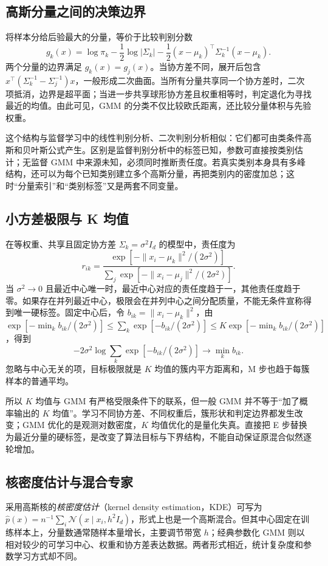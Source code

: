 \documentclass[UTF8,12pt,a4paper,fontset=fandol]{ctexart}
\begin{document}
\subsection{高斯分量之间的决策边界}
将样本分给后验最大的分量，等价于比较判别分数
\[
g_k(x)=\log\pi_k-\frac12\log|\Sigma_k|
-\frac12(x-\mu_k)^\top\Sigma_k^{-1}(x-\mu_k).
\]
两个分量的边界满足 $g_k(x)=g_j(x)$。当协方差不同，展开后包含 $x^\top(\Sigma_k^{-1}-\Sigma_j^{-1})x$，一般形成二次曲面。当所有分量共享同一个协方差时，二次项抵消，边界是超平面；当进一步共享球形协方差且权重相等时，判定退化为寻找最近的均值。由此可见，GMM 的分类不仅比较欧氏距离，还比较分量体积与先验权重。

这个结构与监督学习中的线性判别分析、二次判别分析相似：它们都可由类条件高斯和贝叶斯公式产生。区别是监督判别分析中的标签已知，参数可直接按类别估计；无监督 GMM 中来源未知，必须同时推断责任度。若真实类别本身具有多峰结构，还可以为每个已知类别建立多个高斯分量，再把类别内的密度加总；这时“分量索引”和“类别标签”又是两套不同变量。

\subsection{小方差极限与 K 均值}
在等权重、共享且固定协方差 $\Sigma_k=\sigma^2I_d$ 的模型中，责任度为
\[
r_{ik}=\frac{\exp[-\|x_i-\mu_k\|^2/(2\sigma^2)]}
{\sum_j\exp[-\|x_i-\mu_j\|^2/(2\sigma^2)]}.
\]
当 $\sigma^2\to0$ 且最近中心唯一时，最近中心对应的责任度趋于一，其他责任度趋于零。如果存在并列最近中心，极限会在并列中心之间分配质量，不能无条件宣称得到唯一硬标签。固定中心后，令 $b_{ik}=\|x_i-\mu_k\|^2$，由
$\exp[-\min_kb_{ik}/(2\sigma^2)]\leq\sum_k\exp[-b_{ik}/(2\sigma^2)]\leq K\exp[-\min_kb_{ik}/(2\sigma^2)]$，得到
\begin{equation}
-2\sigma^2\log\sum_k\exp[-b_{ik}/(2\sigma^2)]
\longrightarrow\min_k b_{ik}.
\label{eq:gmm-kmeans-limit}
\end{equation}
忽略与中心无关的项，目标极限就是 $K$ 均值的簇内平方距离和，M 步也趋于每簇样本的普通平均。

所以 $K$ 均值与 GMM 有严格受限条件下的联系，但一般 GMM 并不等于“加了概率输出的 $K$ 均值”。学习不同协方差、不同权重后，簇形状和判定边界都发生改变；GMM 优化的是观测对数密度，$K$ 均值优化的是量化失真。直接把 E 步替换为最近分量的硬标签，是改变了算法目标与下界结构，不能自动保证原混合似然逐轮增加。

\subsection{核密度估计与混合专家}
采用高斯核的\emph{核密度估计}（kernel density estimation，KDE）可写为 $\widehat p(x)=n^{-1}\sum_i\mathcal N(x\mid x_i,h^2I_d)$，形式上也是一个高斯混合。但其中心固定在训练样本上，分量数通常随样本量增长，主要调节带宽 $h$；经典参数化 GMM 则以相对较少的可学习中心、权重和协方差表达数据。两者形式相近，统计复杂度和参数学习方式却不同。
\end{document}
